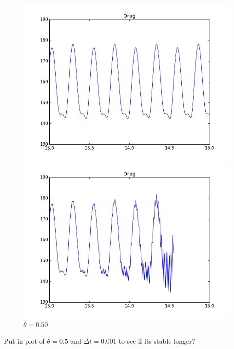 \begin{figure}[H]
\begin{minipage}[b]{0.5\linewidth}
  \end{minipage} 
  \begin{minipage}[b]{0.5\linewidth}
    \centering
    \includegraphics[scale=0.35]{./Verification_Validation/Temporal_stability/FSI2_001_051_small.png} 
    \caption{$\theta = 0.51 $} 
    \vspace{4ex}
  \end{minipage}%
  \begin{minipage}[b]{0.5\linewidth}
    \centering
    \includegraphics[scale=0.35]{./Verification_Validation/Temporal_stability/FSI2_001_050_small.png} 
    \caption{$\theta = 0.50 $} 
    \vspace{4ex}
  \end{minipage} 
\end{figure}

Put in plot of $\theta = 0.5$ and $\Delta t = 0.001$ to see if its stable longer?
